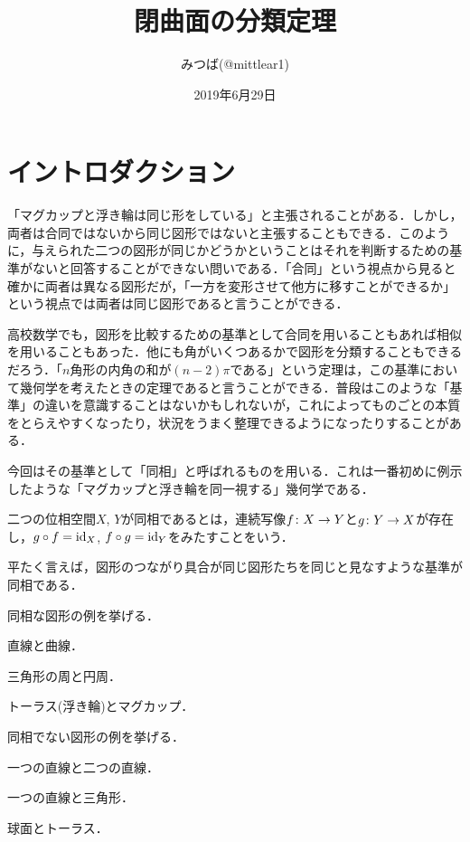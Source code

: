 \documentclass[dvipdfmx,uplatex]{jsarticle}
\title{閉曲面の分類定理}
\author{みつば(@mittlear1)}
\date{2019年6月29日}
\begin{document}
\maketitle
\section{イントロダクション}
「マグカップと浮き輪は同じ形をしている」と主張されることがある．しかし，両者は合同ではないから同じ図形ではないと主張することもできる．このように，与えられた二つの図形が同じかどうかということはそれを判断するための基準がないと回答することができない問いである．「合同」という視点から見ると確かに両者は異なる図形だが，「一方を変形させて他方に移すことができるか」という視点では両者は同じ図形であると言うことができる．

高校数学でも，図形を比較するための基準として合同を用いることもあれば相似を用いることもあった．他にも角がいくつあるかで図形を分類することもできるだろう．「$n$角形の内角の和が$(n-2)\pi$である」という定理は，この基準において幾何学を考えたときの定理であると言うことができる．普段はこのような「基準」の違いを意識することはないかもしれないが，これによってものごとの本質をとらえやすくなったり，状況をうまく整理できるようになったりすることがある．

今回はその基準として「同相」と呼ばれるものを用いる．これは一番初めに例示したような「マグカップと浮き輪を同一視する」幾何学である．
\begin{definition}\label{homeo}
二つの位相空間$X$, $Y$が同相であるとは，連続写像$f\colon X\to Y$と$g\colon Y\to X$が存在し，$g\circ f=\mathrm{id}_X$, $f\circ g=\mathrm{id}_Y$をみたすことをいう．
\end{definition}

平たく言えば，図形のつながり具合が同じ図形たちを同じと見なすような基準が同相である．

\begin{example}
同相な図形の例を挙げる．
\begin{enumromanp}
\item 直線と曲線．
\item 三角形の周と円周．
\item トーラス(浮き輪)とマグカップ．
\end{enumromanp}
同相でない図形の例を挙げる．
\begin{enumromanp}
\item 一つの直線と二つの直線．
\item 一つの直線と三角形．
\item 球面とトーラス．
\end{enumromanp}
\end{example}
\end{document}

